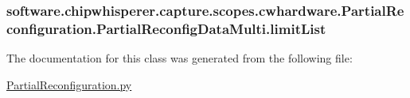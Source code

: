\subsubsection[{limit\+List}]{\setlength{\rightskip}{0pt plus 5cm}software.\+chipwhisperer.\+capture.\+scopes.\+cwhardware.\+Partial\+Reconfiguration.\+Partial\+Reconfig\+Data\+Multi.\+limit\+List}\label{classsoftware_1_1chipwhisperer_1_1capture_1_1scopes_1_1cwhardware_1_1PartialReconfiguration_1_1PartialReconfigDataMulti_a37f9fa12008e1e061d085f1548599cdc}


The documentation for this class was generated from the following file\+:\begin{DoxyCompactItemize}
\item 
\hyperlink{PartialReconfiguration_8py}{Partial\+Reconfiguration.\+py}\end{DoxyCompactItemize}
